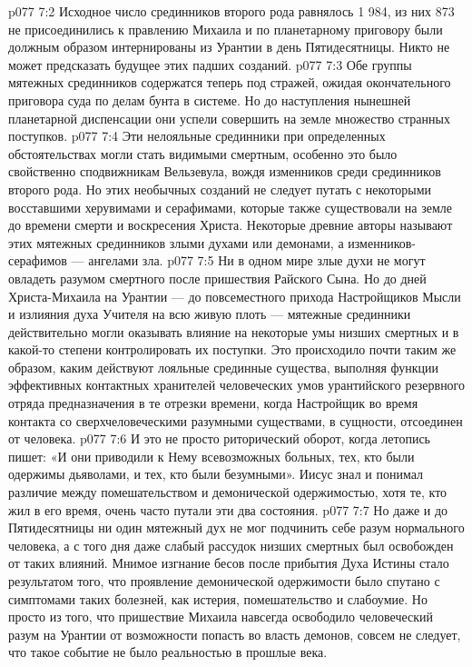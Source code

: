 \vs p077 7:2 Исходное число срединников второго рода равнялось 1 984, из них 873 не присоединились к правлению Михаила и по планетарному приговору были должным образом интернированы из Урантии в день Пятидесятницы. Никто не может предсказать будущее этих падших созданий.
\vs p077 7:3 Обе группы мятежных срединников содержатся теперь под стражей, ожидая окончательного приговора суда по делам бунта в системе. Но до наступления нынешней планетарной диспенсации они успели совершить на земле множество странных поступков.
\vs p077 7:4 Эти нелояльные срединники при определенных обстоятельствах могли стать видимыми смертным, особенно это было свойственно сподвижникам Вельзевула, вождя изменников среди срединников второго рода. Но этих необычных созданий не следует путать с некоторыми восставшими херувимами и серафимами, которые также существовали на земле до времени смерти и воскресения Христа. Некоторые древние авторы называют этих мятежных срединников злыми духами или демонами, а изменников\hyp{}серафимов --- ангелами зла.
\vs p077 7:5 Ни в одном мире злые духи не могут овладеть разумом смертного после пришествия Райского Сына. Но до дней Христа\hyp{}Михаила на Урантии --- до повсеместного прихода Настройщиков Мысли и излияния духа Учителя на всю живую плоть --- мятежные срединники действительно могли оказывать влияние на некоторые умы низших смертных и в какой\hyp{}то степени контролировать их поступки. Это происходило почти таким же образом, каким действуют лояльные срединные существа, выполняя функции эффективных контактных хранителей человеческих умов урантийского резервного отряда предназначения в те отрезки времени, когда Настройщик во время контакта со сверхчеловеческими разумными существами, в сущности, отсоединен от человека.
\vs p077 7:6 И это не просто риторический оборот, когда летопись пишет: «И они приводили к Нему всевозможных больных, тех, кто были одержимы дьяволами, и тех, кто были безумными». Иисус знал и понимал различие между помешательством и демонической одержимостью, хотя те, кто жил в его время, очень часто путали эти два состояния.
\vs p077 7:7 Но даже и до Пятидесятницы ни один мятежный дух не мог подчинить себе разум нормального человека, а с того дня даже слабый рассудок низших смертных был освобожден от таких влияний. Мнимое изгнание бесов после прибытия Духа Истины стало результатом того, что проявление демонической одержимости было спутано с симптомами таких болезней, как истерия, помешательство и слабоумие. Но просто из того, что пришествие Михаила навсегда освободило человеческий разум на Урантии от возможности попасть во власть демонов, совсем не следует, что такое событие не было реальностью в прошлые века.
